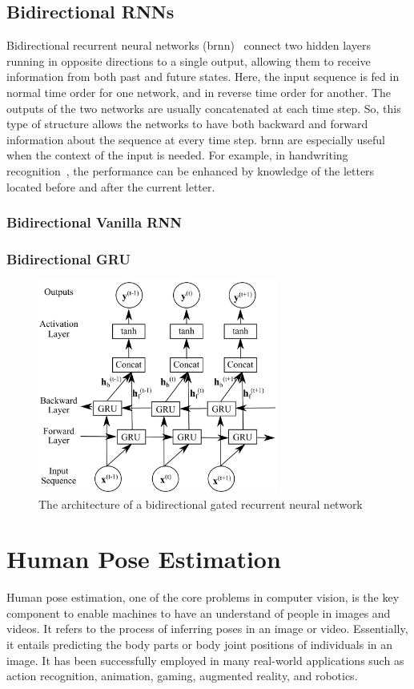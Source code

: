 \subsection{Bidirectional RNNs}
Bidirectional recurrent neural networks (\gls{brnn})~\cite{Schuster_97} connect two hidden layers running in opposite directions to a single output, allowing them to receive information from both past and future states. Here, the input sequence is fed in normal time order for one network, and in reverse time order for another. The outputs of the two networks are usually concatenated at each time step. So, this type of structure allows the networks to have both backward and forward information about the sequence at every time step. \gls{brnn} are especially useful when the context of the input is needed. For example, in handwriting recognition~\cite{Graves_08}, the performance can be enhanced by knowledge of the letters located before and after the current letter. 


\subsubsection{Bidirectional Vanilla RNN}

\subsubsection{Bidirectional GRU}
\begin{figure}[t]
	\centering
	\includegraphics[width=0.7\textwidth]{figures/bigru.eps}
	\caption{The architecture of a bidirectional gated recurrent neural network \label{fig:bidirectional_rnn}}
\end{figure}

\section{Human Pose Estimation}
Human pose estimation, one of the core problems in computer vision, is the key component to enable machines to have an understand of people in images and videos. It refers to the process of inferring poses in an image or video. Essentially, it entails predicting the body parts or body joint positions of individuals in an image. It has been successfully employed in many real-world applications such as action recognition, animation, gaming, augmented reality, and robotics. 

